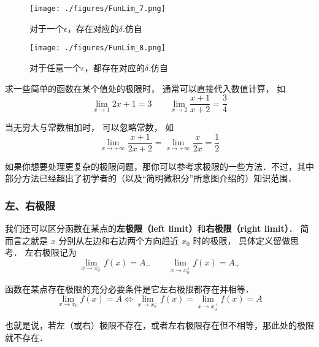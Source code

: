 \begin{figure}[ht]
\centering
\texttt{[image: ./figures/FunLim\_7.png]}
\caption{对于一个$\epsilon$，存在对应的$\delta$.仿自\cite{Thomas}} \label{FunLim_fig7}
\end{figure}

\begin{figure}[ht]
\centering
\texttt{[image: ./figures/FunLim\_8.png]}
\caption{对于任意一个$\epsilon$，都存在对应的$\delta$.仿自\cite{Thomas}} \label{FunLim_fig8}
\end{figure}

\begin{example}{}
求一些简单的函数在某个值处的极限时， 通常可以直接代入数值计算， 如
\begin{equation}
\lim_{x\to 1} 2x + 1 = 3 \qquad \lim_{x\to 2}\frac{x + 1}{x + 2} = \frac34
\end{equation}

当无穷大与常数相加时， 可以忽略常数， 如
\begin{equation}
\lim_{x\to +\infty} \frac{x + 1}{2x + 2} = \lim_{x\to +\infty} \frac{x}{2x} = \frac12
\end{equation}

如果你想要处理更复杂的极限问题，那你可以参考求极限的一些方法．不过，其中部分方法已经超出了初学者的（以及“简明微积分”所意图介绍的）知识范围．
\end{example}

\subsubsection{左、右极限}
我们还可以区分函数在某点的\textbf{左极限（left limit）}和\textbf{右极限（right limit）}． 简而言之就是 $x$ 分别从左边和右边两个方向趋近 $x_0$ 时的极限， 具体定义留做思考． 左右极限记为
\begin{equation}
\lim_{x\to x_0^-} f(x) = A_- \qquad \lim_{x\to x_0^+} f(x) = A_+
\end{equation}

\begin{theorem}{}
函数在某点存在极限的充分必要条件是它左右极限都存在并相等．
$$\lim_{x\to x_0} f(x) = A \Leftrightarrow \lim_{x\to x_0^-} f(x) = \lim_{x\to x_0^+} f(x) = A $$

也就是说，若左（或右）极限不存在，或者左右极限存在但不相等，那此处的极限就不存在．
\end{theorem}

